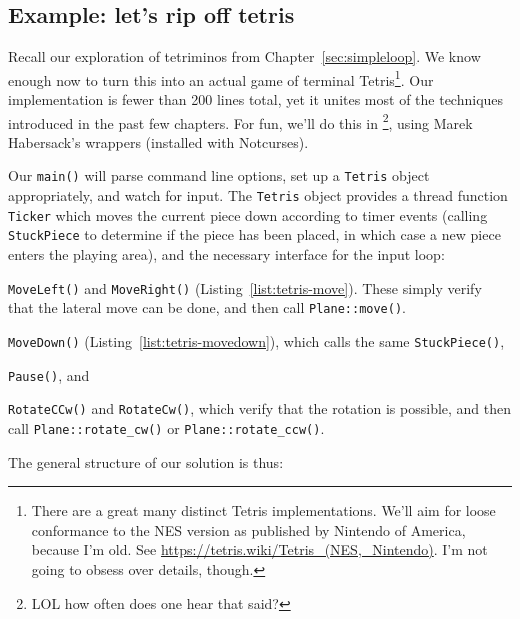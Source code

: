 \subsection{Example: let's rip off tetris}
\label{sec:casestudy}
Recall our exploration of tetriminos from Chapter~\ref{sec:simpleloop}. We
know enough now to turn this into an actual game of terminal Tetris\footnote{There
are a great many distinct Tetris implementations. We'll aim for loose
conformance to the NES version as published by Nintendo of America, because
I'm old. See \url{https://tetris.wiki/Tetris_(NES,_Nintendo)}. I'm not going
to obsess over details, though.}. Our implementation is fewer than 200 lines
total, yet it unites most of the techniques introduced in the past few
chapters. For fun, we'll do this in \CC\footnote{LOL how often does one hear
that said?}, using Marek Habersack's \CC wrappers (installed with Notcurses).

Our \texttt{main()} will parse command line options, set up a \texttt{Tetris}
object appropriately, and watch for input. The \texttt{Tetris} object provides
a thread function \texttt{Ticker} which moves the current piece down according
to timer events (calling \texttt{StuckPiece} to determine if the piece has been
placed, in which case a new piece enters the playing area), and the necessary
interface for the input loop:

\begin{denseitemize}
\item{\texttt{MoveLeft()} and \texttt{MoveRight()}
    (Listing~\ref{list:tetris-move}). These simply verify that the lateral
    move can be done, and then call \texttt{Plane::move()}.}
\item{\texttt{MoveDown()} (Listing~\ref{list:tetris-movedown}), which calls the same \texttt{StuckPiece()},}
\item{\texttt{Pause()}, and}
\item{\texttt{RotateCCw()} and \texttt{RotateCw()}, which verify that the rotation
      is possible, and then call \texttt{Plane::rotate\_cw()} or \texttt{Plane::rotate\_ccw()}.}
\end{denseitemize}

The general structure of our solution is thus:


